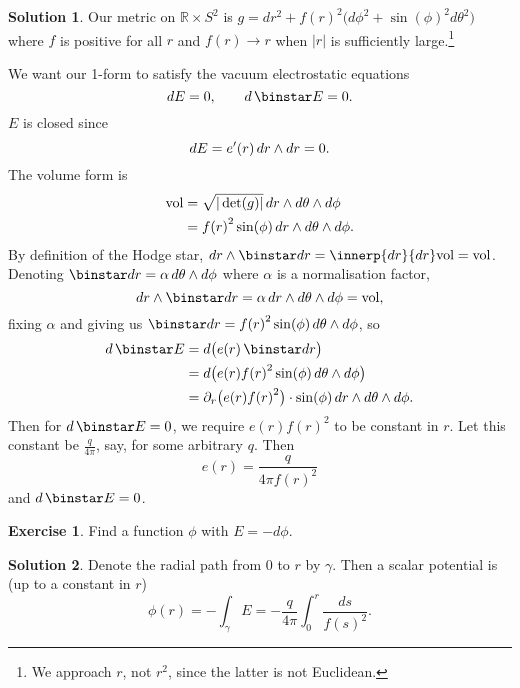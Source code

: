\documentclass[11pt, a4paper]{report}
\theoremstyle{definition}
\newtheorem{exercise}{Exercise}[part]
\newtheorem{solution}{Solution}[part]
\newenvironment{ex}{\begin{exercise}}{\end{exercise}\pagebreak[1]}
\newenvironment{sol}{\begin{solution}}{\end{solution}\pagebreak[3]}
\renewcommand*{\d}{\ensuremath\mathop{}\mathopen{}d}
\renewcommand*{\star}{\ensuremath\mathop{}\mathopen\binstar\mathord{}}
\begin{document}
\begin{sol}

Our metric on $\mathbb{R} \times S^2$ is $g = dr^2 + {f(r)}^2 \bigl( d\phi^2 + {\sin(\phi)}^2 d\theta^2 \bigr)$ where $f$ is positive for all $r$ and $f(r) \to r$ when $|r|$ is sufficiently large.\footnote{We approach $r$, not $r^2$, since the latter is not Euclidean.}

We want our 1-form to satisfy the vacuum electrostatic equations
\[
    dE = 0, \qquad
    d \star E = 0.
\]
$E$ is closed since
\[
    dE = e'(r) \d r \wedge dr = 0.
\]
The volume form is
\begin{align*}
    \text{vol} &= \sqrt{|\det(g)|} \d r \wedge d\theta \wedge d\phi \\
               &= {f(r)}^2 \sin(\phi) \d r \wedge d\theta \wedge d\phi.
\end{align*}
By definition of the Hodge star, $dr \wedge \star dr = \innerp{dr}{dr} \text{vol} = \text{vol}$.
Denoting $\star dr = \alpha \d \theta \wedge d\phi$ where $\alpha$ is a normalisation factor,
\[
    dr \wedge \star dr = \alpha \d r \wedge d\theta \wedge d\phi = \text{vol},
\]
fixing $\alpha$ and giving us $\star dr = {f(r)}^2 \sin(\phi) \d \theta \wedge d\phi$, so
\begin{align*}
    d \star E &= d \bigl( e(r) \star dr \bigr) \\
              &= d \bigl( e(r) {f(r)}^2 \sin(\phi) \d \theta \wedge d\phi \bigr) \\
              &= \partial_r \bigl( e(r) {f(r)}^2 \bigr) \cdot \sin(\phi) \d r \wedge d\theta \wedge d\phi.
\end{align*}
Then for $d \star E = 0$, we require $e(r) {f(r)}^2$ to be constant in $r$.
Let this constant be $\frac{q}{4 \pi}$, say, for some arbitrary $q$. Then
\[
    e(r) = \frac{q}{4 \pi {f(r)}^2}
\]
and $d \star E = 0$.

\end{sol}

\begin{ex}

Find a function $\phi$ with $E = -d\phi$.

\end{ex}

\begin{sol}

Denote the radial path from $0$ to $r$ by $\gamma$. Then a scalar potential is (up to a constant in $r$)
\[
    \phi(r) = -\int_\gamma E = -\frac{q}{4\pi}\int_0^r \frac{ds}{{f(s)}^2}.
\]

\end{sol}
\end{document}
